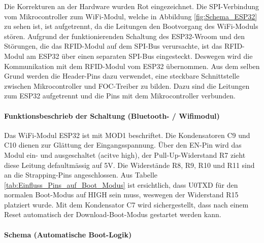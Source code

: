 Die Korrekturen an der Hardware wurden Rot eingezeichnet. Die SPI-Verbindung vom Mikrocontroller zum WiFi-Modul, welche in Abbildung \ref{fig:Schema_ESP32} zu sehen ist, ist aufgetrennt, da die Leitungen den Bootvorgang des WiFi-Moduls stören. Aufgrund der funktionierenden Schaltung des ESP32-Wroom und den Störungen, die das RFID-Modul auf dem SPI-Bus verursachte, ist das RFID-Modul am ESP32 über einen separaten SPI-Bus eingesteckt. Deswegen wird die Kommunikation mit dem RFID-Modul vom ESP32 übernommen. Aus dem selben Grund werden die Header-Pins dazu verwendet, eine steckbare Schnittstelle zwischen Mikrocontroller und FOC-Treiber zu bilden. Dazu sind die Leitungen zum ESP32 aufgetrennt und die Pins mit dem Mikrocontroller verbunden.
\newpage
\paragraph{Funktionsbeschrieb der Schaltung (Bluetooth- / Wifimodul)}\mbox{}

Das WiFi-Modul ESP32 ist mit MOD1 beschriftet. Die Kondensatoren C9 und C10 dienen zur Glättung der Eingangsspannung. Über den EN-Pin wird das Modul ein- und ausgeschaltet (acitve high), der Pull-Up-Widerstand R7 zieht diese Leitung defaultmässig auf 5V. Die Widerstände R8, R9, R10 und R11 sind an die Strapping-Pins angeschlossen.
Aus Tabelle \ref{tab:Einfluss_Pins_auf_Boot_Modus} ist ersichtlich, dass U0TXD für den normalen Boot-Modus auf HIGH sein muss, weswegen der Widerstand R15 platziert wurde. Mit dem Kondensator C7 wird sichergestellt, dass nach einem Reset automatisch der Download-Boot-Modus gestartet werden kann.


\paragraph{Schema (Automatische Boot-Logik)}\mbox{}

